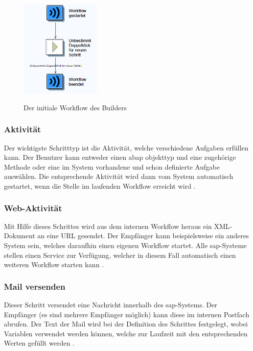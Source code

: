 \begin{figure}[h]
	\begin{center}
	\includegraphics[width=150px]{grafiken/wf-builder_new-wf.png}
	\caption{Der initiale Workflow des Builders}
	\vspace{-10pt}
	\label{abb:workflow-easy}
	\end{center}
\end{figure}

\subsubsection{Aktivität}
Der wichtigste Schritttyp ist die Aktivität, welche verschiedene Aufgaben erfüllen kann. Der Benutzer kann entweder einen \gls{abap} \gls{objekttyp} und eine zugehörige Methode oder eine im System vorhandene und schon definierte Aufgabe auswählen. Die entsprechende Aktivität wird dann vom System automatisch gestartet, wenn die Stelle im laufenden Workflow erreicht wird \cite{SAPHelpWf}.

\subsubsection{Web-Aktivität}
Mit Hilfe dieses Schrittes wird aus dem internen Workflow heraus ein XML-Dokument an eine URL gesendet. Der Empfänger kann beispielsweise ein anderes System sein, welches daraufhin einen eigenen Workflow startet. Alle \gls{sap}-Systeme stellen einen Service zur Verfügung, welcher in diesem Fall automatisch einen weiteren Workflow starten kann \cite{SAPHelpWf}.

\subsubsection{Mail versenden}
Dieser Schritt versendet eine Nachricht innerhalb des \gls{sap}-Systems. Der Empfänger (es sind mehrere Empfänger möglich) kann diese im internen Postfach abrufen. Der Text der Mail wird bei der Definition des Schrittes festgelegt, wobei Variablen verwendet werden können, welche zur Laufzeit mit den entsprechenden Werten gefüllt werden \cite{SAPHelpWf}.

